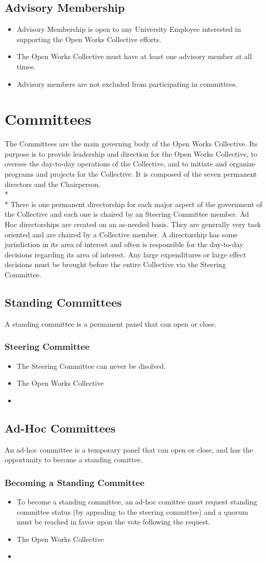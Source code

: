 \documentclass{article}
\newcommand{\article}[1]{\section{#1} \label{#1}}
\newcommand{\asection}[1]{\subsection{#1} \label{#1}}
\newcommand{\asubsection}[1]{\subsubsection{#1} \label{#1}}
\begin{document}
\asection{Advisory Membership}
\begin{itemize}
	\item Advisory Membership is open to any University Employee interested in supporting the Open Works Collective efforts.
	\item The Open Works Collective must have at least one advisory member at all times.
	\item Advisory members are not excluded from participating in committees.
\end{itemize}
\newpage
%
%
\article{Committees}
The Committees are the main governing body of the Open Works Collective.
Its purpose is to provide leadership and direction for the Open Works Collective, to oversee the day-to-day operations of the Collective, and to initiate and organize programs and projects for the Collective.
It is composed of the seven permanent directors and the Chairperson.
\\*\\*
There is one permanent directorship for each major aspect of the government of the Collective and each one is chaired by an Steering Committee member.
Ad Hoc directorships are created on an as-needed basis.
They are generally very task oriented and are chaired by a Collective member.
A directorship has some jurisdiction in its area of interest and often is responsible for the day-to-day decisions regarding its area of interest.
Any large expenditures or large effect decisions must be brought before the entire Collective via the Steering Committee.

\asection{Standing Committees}
A standing committee is a permanent panel that can open or close.
\asubsection{Steering Committee}
\begin{itemize}
	\item The Steering Committee can never be disolved.
	\item The Open Works Collective
	\item 
\end{itemize}

\asection{Ad-Hoc Committees}
An ad-hoc committee is a temporary panel that can open or close, and has the opportunity to become a standing comittee.
\asubsection{Becoming a Standing Committee}
\begin{itemize}
	\item To become a standing committee, an ad-hoc comittee must request standing committee status (by appealing to the steering committee) and a quorum must be reached in favor upon the vote following the request. 
	\item The Open Works Collective
	\item 
\end{itemize}
\end{document}
